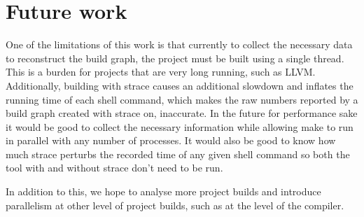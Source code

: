 \documentclass[sigconf,10pt,review,authorversion]{acmart}\settopmatter{printfolios=true,printccs=false,printacmref=false}
\begin{document}

\section{Future work}

One of the limitations of this work is that currently to collect the necessary data to reconstruct
the build graph, the project must be built using a single thread.  This is a burden for projects
that are very long running, such as LLVM.  Additionally, building with strace causes an additional
slowdown and inflates the running time of each shell command, which makes the raw numbers
reported by a build graph created with strace on, inaccurate.  In the future for performance sake
it would be good to collect the necessary information while allowing make to run in parallel with
any number of processes.  It would also be good to know how much strace perturbs the recorded
time of any given shell command so both the tool with and without strace don't need to be run.

In addition to this, we hope to analyse more project builds and introduce parallelism at other
level of project builds, such as at the level of the compiler.  

 

\balance
\end{document}
